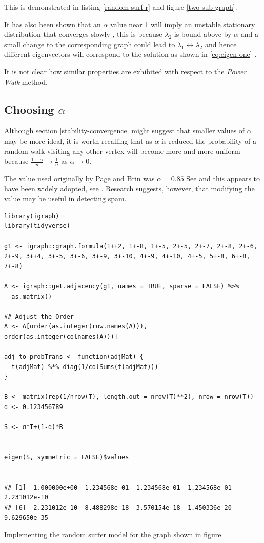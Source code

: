 \documentclass[11pt]{article}
\begin{document}
This is demonstrated in listing \ref{random-surf-r} and figure \ref{two-sub-graph}.

It has also been shown that an \(\alpha\) value near 1 will imply an unstable
stationary distribution \cite{ngStableAlgorithmsLink2001} that converges slowly
\cite{tanNewExtrapolationMethod2017a}, this is because \(\lambda_{2}\) is bound above by
\(\alpha\) and a small change to the corresponding graph could lead to
\(\lambda_{1} \leftrightarrow \lambda_{2}\) and hence different eigenvectors will
correspond to the solution as shown in \eqref{eq:eigen-one} .

It is not clear how similar properties are exhibited with respect to the \emph{Power Walk} method. \cite{parkPowerWalkRevisiting2013}

\subsection{Choosing \(\alpha\)}
\label{choosing-alpha}
Although section \ref{stability-convergence} might suggest that smaller values of
\(\alpha\) may be more ideal, it is worth recalling that as \(\alpha\) is reduced
the probability of a random walk visiting any other vertex will become more and
more uniform because \(\frac{1-\alpha}{n} \rightarrow \frac{1}{n}\) as \(\alpha
\rightarrow 0\). \cite{parkPowerWalkRevisiting2013}

The value used originally by Page and Brin was \(\alpha = 0.85\) See
\cite[p. 109]{larrypageAnatomyLargescaleHypertextual1998} and this appears to have been
widely adopted, see
\cite{kamvarAdaptiveMethodsComputation2004b,boldiPageRankFunctionDamping2005}.
Research suggests, however, that modifying the value may be useful in detecting
spam.
\cite{zhangMakingEigenvectorBasedReputation2004,boldiPageRankFunctionDamping2005}


\begin{listing}[htbp]
\begin{verbatim}
library(igraph)
library(tidyverse)

g1 <- igraph::graph.formula(1++2, 1+-8, 1+-5, 2+-5, 2+-7, 2+-8, 2+-6, 2+-9, 3++4, 3+-5, 3+-6, 3+-9, 3+-10, 4+-9, 4+-10, 4+-5, 5+-8, 6+-8, 7+-8)

A <- igraph::get.adjacency(g1, names = TRUE, sparse = FALSE) %>%
  as.matrix()

## Adjust the Order
A <- A[order(as.integer(row.names(A))), order(as.integer(colnames(A)))]

adj_to_probTrans <- function(adjMat) {
  t(adjMat) %*% diag(1/colSums(t(adjMat)))
}

B <- matrix(rep(1/nrow(T), length.out = nrow(T)**2), nrow = nrow(T))
ɑ <- 0.123456789

S <- ɑ*T+(1-ɑ)*B


eigen(S, symmetric = FALSE)$values


## [1]  1.000000e+00 -1.234568e-01  1.234568e-01 -1.234568e-01  2.231012e-10
## [6] -2.231012e-10 -8.488298e-18  3.570154e-18 -1.450336e-20  9.629650e-35
\end{verbatim}
\caption{\label{random-surf-r}Implementing the random surfer model for the graph shown in figure }
\end{listing}
\end{document}
